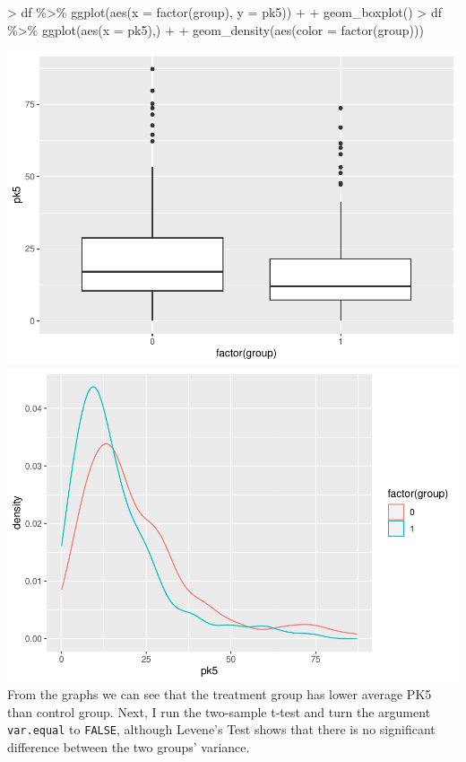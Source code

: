 \documentclass[
]{article}
\newenvironment{Shaded}{\begin{snugshade}}{\end{snugshade}}
\newcommand{\AttributeTok}[1]{\textcolor[rgb]{0.77,0.63,0.00}{#1}}
\newcommand{\FunctionTok}[1]{\textcolor[rgb]{0.00,0.00,0.00}{#1}}
\newcommand{\NormalTok}[1]{#1}
\newcommand{\SpecialCharTok}[1]{\textcolor[rgb]{0.00,0.00,0.00}{#1}}
\begin{document}
\begin{Shaded}
\begin{Highlighting}[]
\SpecialCharTok{\textgreater{}}\NormalTok{ df }\SpecialCharTok{\%\textgreater{}\%} \FunctionTok{ggplot}\NormalTok{(}\FunctionTok{aes}\NormalTok{(}\AttributeTok{x =} \FunctionTok{factor}\NormalTok{(group), }\AttributeTok{y =}\NormalTok{ pk5)) }\SpecialCharTok{+} 
\SpecialCharTok{+}   \FunctionTok{geom\_boxplot}\NormalTok{()}
\SpecialCharTok{\textgreater{}}\NormalTok{ df }\SpecialCharTok{\%\textgreater{}\%} \FunctionTok{ggplot}\NormalTok{(}\FunctionTok{aes}\NormalTok{(}\AttributeTok{x =}\NormalTok{ pk5),) }\SpecialCharTok{+}
\SpecialCharTok{+}   \FunctionTok{geom\_density}\NormalTok{(}\FunctionTok{aes}\NormalTok{(}\AttributeTok{color =} \FunctionTok{factor}\NormalTok{(group)))}
\end{Highlighting}
\end{Shaded}

\includegraphics[width=0.5\linewidth,height=0.25\textheight]{Homework_07_new_Pan_files/figure-latex/unnamed-chunk-1-1}
\includegraphics[width=0.5\linewidth,height=0.25\textheight]{Homework_07_new_Pan_files/figure-latex/unnamed-chunk-1-2}
From the graphs we can see that the treatment group has lower average
PK5 than control group. Next, I run the two-sample t-test and turn the
argument \texttt{var.equal} to \texttt{FALSE}, although Levene's Test
shows that there is no significant difference between the two groups'
variance.
\end{document}
